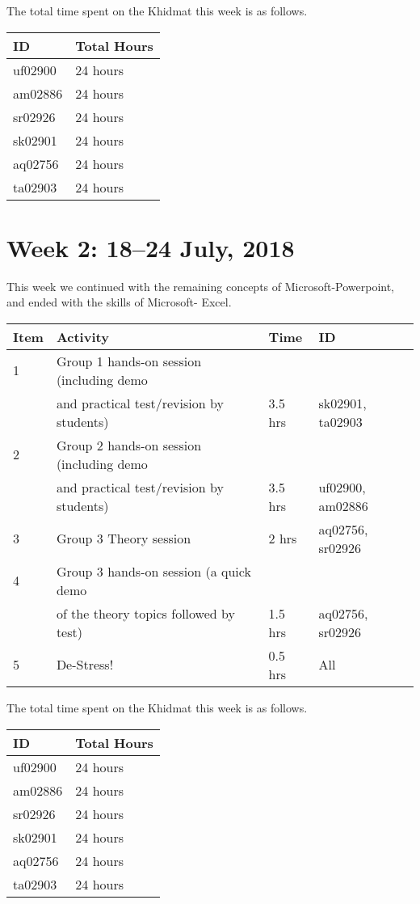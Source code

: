 \documentclass{article}
\begin{document}
The total time spent on the Khidmat this week is as follows.

\begin{tabular}{|l|l|}
  \hline
  ID & Total Hours\\\hline\hline
  uf02900 & 24 hours\\\hline
  am02886 & 24 hours\\\hline
  sr02926 & 24 hours\\\hline
  sk02901 & 24 hours\\\hline
  aq02756 & 24 hours\\\hline
  ta02903 & 24 hours\\\hline
\end{tabular}

\section*{Week 2: 18--24 July, 2018}
This week we continued with the remaining concepts of Microsoft-Powerpoint, and ended with the skills of Microsoft- Excel.

\begin{tabular}{|l|l|l|l|}
  \hline
  Item 	& Activity & Time & ID \\\hline\hline
  1	& Group 1 hands-on session (including demo&&\\ &and practical test/revision by students) & 3.5 hrs & sk02901, ta02903 \\\hline
  2	& Group 2 hands-on session (including demo&&\\ &and practical test/revision by students) & 3.5 hrs & uf02900, am02886 \\\hline
  3	& Group 3 Theory session & 2 hrs & aq02756, sr02926 \\\hline
  4	& Group 3 hands-on session (a quick demo&&\\ &of the theory topics followed by test) & 1.5 hrs & aq02756, sr02926 \\\hline
  5	& De-Stress! & 0.5 hrs & All \\\hline    
\end{tabular}

The total time spent on the Khidmat this week is as follows.

\begin{tabular}{|l|l|}
  \hline
  ID & Total Hours\\\hline\hline
  uf02900 & 24 hours\\\hline
  am02886 & 24 hours\\\hline
  sr02926 & 24 hours\\\hline
  sk02901 & 24 hours\\\hline
  aq02756 & 24 hours\\\hline
  ta02903 & 24 hours\\\hline
\end{tabular}
\newpage
\end{document}
